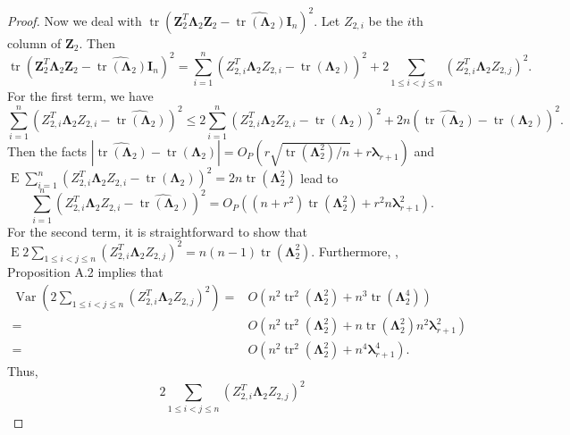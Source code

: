 \documentclass[12pt]{article} %
\DeclareMathOperator{\mytr}{tr}
\DeclareMathOperator{\myE}{E}
\DeclareMathOperator{\myVar}{Var}
\newcommand{\bZ}{\mathbf{Z}}
\newcommand{\bI}{\mathbf{I}}
\newcommand{\bfsym}[1]{\ensuremath{\boldsymbol{#1}}}
\def\blambda {\bfsym {\lambda}}
\def\bLambda {\bfsym {\Lambda}}
\theoremstyle{definition}
\begin{document}
\begin{appendices}
\begin{proof}
    Now we deal with $\mytr(\bZ_2^T \bLambda_2 \bZ_2-\widehat{\mytr(\bLambda_2)}\bI_n)^2$.
    Let $Z_{2,i}$ be the $i$th column of $\bZ_2$.
    Then
    \begin{equation*}
        \mytr(\bZ_2^T \bLambda_2 \bZ_2-\widehat{\mytr(\bLambda_2)}\bI_n)^2
        =
        \sum_{i=1}^n (Z_{2,i}^T \bLambda_2 Z_{2,i}-\widehat{\mytr(\bLambda_2)})^2
        +
        2\sum_{1\leq i<j\leq n} (Z_{2,i}^T \bLambda_2 Z_{2,j})^2.
    \end{equation*}
    For the first term, we have 
    \begin{equation*}
        \sum_{i=1}^n (Z_{2,i}^T \bLambda_2 Z_{2,i}-\widehat{\mytr(\bLambda_2)})^2
        \leq
        2\sum_{i=1}^n (Z_{2,i}^T \bLambda_2 Z_{2,i}-\mytr(\bLambda_2))^2
        +2n(\widehat{\mytr(\bLambda_2)}-\mytr(\bLambda_2))^2.
    \end{equation*}
    Then the facts $|\widehat{\mytr(\bLambda_2)}-\mytr(\bLambda_2)|=O_P(r\sqrt{\mytr(\bLambda_2^2)/n}+r\blambda_{r+1})$ and
    $
        \myE
        \sum_{i=1}^n (Z_{2,i}^T \bLambda_2 Z_{2,i}-\mytr(\bLambda_2))^2
        =2n \mytr(\bLambda_2^2)
        $ lead to
        \begin{equation}\label{abcd1}
        \sum_{i=1}^n (Z_{2,i}^T \bLambda_2 Z_{2,i}-\widehat{\mytr(\bLambda_2)})^2
        =O_P\left((n+r^2)\mytr(\bLambda_2^2)+r^2 n \blambda_{r+1}^2\right).
\end{equation}
    For the second term, it is straightforward to show that
    $\myE 2\sum_{1\leq i<j\leq n} (Z_{2,i}^T \bLambda_2 Z_{2,j})^2=n(n-1)\mytr(\bLambda_2^2)$.
    Furthermore, \cite{chen2010tests}, Proposition A.2 implies that
    \begin{equation*}
        \begin{split}
        \myVar\left(
            2\sum_{1\leq i<j\leq n} (Z_{2,i}^T \bLambda_2 Z_{2,j})^2
        \right)
        =& O\left(
            n^2 \mytr^2 (\bLambda_2^2) + n^3 \mytr(\bLambda_2^4)
        \right)
        \\
        =& O\left(
            n^2 \mytr^2 (\bLambda_2^2) + n \mytr(\bLambda_{2}^2) n^2 \blambda_{r+1}^2
        \right)
        \\
        =& O\left(
            n^2 \mytr^2 (\bLambda_2^2) + n^4 \blambda_{r+1}^4
        \right)
        .
        \end{split}
    \end{equation*}
    Thus,
    \begin{equation*}
            2\sum_{1\leq i<j\leq n} (Z_{2,i}^T \bLambda_2 Z_{2,j})^2

\end{equation*}
\end{proof}
\end{appendices}
\end{document}
